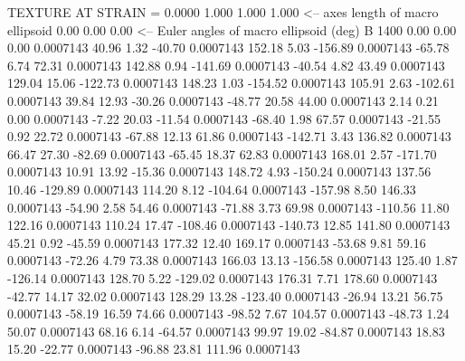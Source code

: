 TEXTURE AT STRAIN =    0.0000
   1.000   1.000   1.000  <-- axes length of macro ellipsoid
    0.00    0.00    0.00  <-- Euler angles of macro ellipsoid (deg)
B      1400
        0.00        0.00        0.00     0.0007143
       40.96        1.32      -40.70     0.0007143
      152.18        5.03     -156.89     0.0007143
      -65.78        6.74       72.31     0.0007143
      142.88        0.94     -141.69     0.0007143
      -40.54        4.82       43.49     0.0007143
      129.04       15.06     -122.73     0.0007143
      148.23        1.03     -154.52     0.0007143
      105.91        2.63     -102.61     0.0007143
       39.84       12.93      -30.26     0.0007143
      -48.77       20.58       44.00     0.0007143
        2.14        0.21        0.00     0.0007143
       -7.22       20.03      -11.54     0.0007143
      -68.40        1.98       67.57     0.0007143
      -21.55        0.92       22.72     0.0007143
      -67.88       12.13       61.86     0.0007143
     -142.71        3.43      136.82     0.0007143
       66.47       27.30      -82.69     0.0007143
      -65.45       18.37       62.83     0.0007143
      168.01        2.57     -171.70     0.0007143
       10.91       13.92      -15.36     0.0007143
      148.72        4.93     -150.24     0.0007143
      137.56       10.46     -129.89     0.0007143
      114.20        8.12     -104.64     0.0007143
     -157.98        8.50      146.33     0.0007143
      -54.90        2.58       54.46     0.0007143
      -71.88        3.73       69.98     0.0007143
     -110.56       11.80      122.16     0.0007143
      110.24       17.47     -108.46     0.0007143
     -140.73       12.85      141.80     0.0007143
       45.21        0.92      -45.59     0.0007143
      177.32       12.40      169.17     0.0007143
      -53.68        9.81       59.16     0.0007143
      -72.26        4.79       73.38     0.0007143
      166.03       13.13     -156.58     0.0007143
      125.40        1.87     -126.14     0.0007143
      128.70        5.22     -129.02     0.0007143
      176.31        7.71      178.60     0.0007143
      -42.77       14.17       32.02     0.0007143
      128.29       13.28     -123.40     0.0007143
      -26.94       13.21       56.75     0.0007143
      -58.19       16.59       74.66     0.0007143
      -98.52        7.67      104.57     0.0007143
      -48.73        1.24       50.07     0.0007143
       68.16        6.14      -64.57     0.0007143
       99.97       19.02      -84.87     0.0007143
       18.83       15.20      -22.77     0.0007143
      -96.88       23.81      111.96     0.0007143
